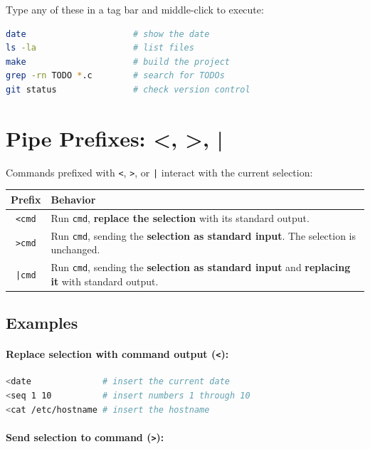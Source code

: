 Type any of these in a tag bar and middle-click to execute:

\begin{lstlisting}[language=bash]
date                     # show the date
ls -la                   # list files
make                     # build the project
grep -rn TODO *.c        # search for TODOs
git status               # check version control
\end{lstlisting}

\section{Pipe Prefixes: <, >, |}
\label{sec:pipes}


Commands prefixed with \texttt{<}, \texttt{>}, or \texttt{|} interact
with the current selection:

\begin{longtable}{@{}cp{3.5in}@{}}
\toprule
Prefix & Behavior \\
\midrule
\endhead
\texttt{<cmd} & Run \texttt{cmd}, \textbf{replace the selection}
  with its standard output. \\
\texttt{>cmd} & Run \texttt{cmd}, sending the \textbf{selection as
  standard input}.  The selection is unchanged. \\
\texttt{|cmd} & Run \texttt{cmd}, sending the \textbf{selection as
  standard input} and \textbf{replacing it} with standard output. \\
\bottomrule
\end{longtable}

\subsection{Examples}

\paragraph{Replace selection with command output (\texttt{<}):}

\begin{lstlisting}[language=bash]
<date              # insert the current date
<seq 1 10          # insert numbers 1 through 10
<cat /etc/hostname # insert the hostname
\end{lstlisting}

\paragraph{Send selection to command (\texttt{>}):}

